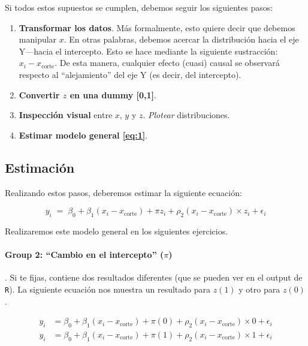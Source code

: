 \documentclass[10pt]{article}
\begin{document}
Si todos estos supuestos se cumplen, debemos seguir los siguientes pasos:

\begin{enumerate}
	\item {\bf Transformar los datos}. M\'as formalmente, esto quiere decir que debemos manipular $x$. En otras palabras, debemos acercar la distribuci\'on hacia el eje Y---hacia el intercepto. Esto se hace mediante la siguiente sustracci\'on: $x_{i}-x_{\text{corte}}$. De esta manera, cualquier efecto (cuasi) causal se observar\'a respecto al ``alejamiento'' del eje Y (es decir, del intercepto).
	\item {\bf Convertir $z$ en una dummy [0,1]}. 
	\item {\bf Inspecci\'on visual} entre $x$, $y$ y $z$. \emph{Plotear} distribuciones.
	\item {\bf Estimar modelo general \autoref{eq:1}}.
\end{enumerate}

\subsection*{Estimaci\'on}


Realizando estos pasos, deberemos estimar la siguiente ecuaci\'on:

		\begin{equation}\label{eq:3}
			y_{i} \;=\; \beta_{0} + \beta_{1}(x_{i}-x_{\text{corte}}) + \pi z_{i} + \rho_{2}(x_{i}-x_{\text{corte}}) \times z_{i} +  \epsilon_{i}
		\end{equation}

Realizaremos este modelo general en los siguientes ejercicios.

\paragraph{Group 2: ``Cambio en el intercepto'' ($\pi$)}. Si te fijas, \label{eq:3} contiene dos resultados diferentes (que se pueden ver en el output de \texttt{R}). La siguiente ecuaci\'on nos muestra un resultado para $z(1)$ y otro para $z(0)$.

\begin{equation} \label{eq:4}
\begin{split}
y_{i} & = \beta_{0} + \beta_{1}(x_{i}-x_{\text{corte}}) + \pi(0) + \rho_{2}(x_{i}-x_{\text{corte}}) \times 0 +  \epsilon_{i} \\
y_{i} & = \beta_{0} + \beta_{1}(x_{i}-x_{\text{corte}}) + \pi(1) + \rho_{2}(x_{i}-x_{\text{corte}}) \times 1 +  \epsilon_{i}
\end{split}
\end{equation}
\end{document}
